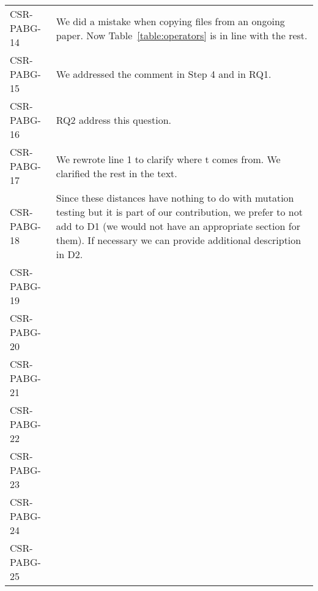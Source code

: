 \begin{longtable}{|p{1.5cm}|p{12cm}|@{}}
\begin{minipage}{12cm}
\end{minipage}\\
\hline
CSR-PABG-14&
\begin{minipage}{12cm}
We did a mistake when copying files from an ongoing paper. Now Table~\ref{table:operators} is in line with the rest.
\end{minipage}\\
\hline
CSR-PABG-15&
\begin{minipage}{12cm}
We addressed the comment in Step 4 and in RQ1.
\end{minipage}\\
\hline
CSR-PABG-16&
\begin{minipage}{12cm}
RQ2 address this question.
\end{minipage}\\
\hline
CSR-PABG-17&
\begin{minipage}{12cm}
We rewrote line 1 to clarify where t comes from.
We clarified the rest in the text.
\end{minipage}\\
\hline
CSR-PABG-18&
\begin{minipage}{12cm}
Since these distances have nothing to do with mutation testing but it is part of our contribution, we prefer to not add to D1 (we would not have an appropriate section for them). If necessary we can provide additional description in D2.
\end{minipage}\\
\hline
CSR-PABG-19&
\begin{minipage}{12cm}
\end{minipage}\\
\hline
CSR-PABG-20&
\begin{minipage}{12cm}
\end{minipage}\\
\hline
CSR-PABG-21&
\begin{minipage}{12cm}
\end{minipage}\\
\hline
CSR-PABG-22&
\begin{minipage}{12cm}
\end{minipage}\\
\hline
CSR-PABG-23&
\begin{minipage}{12cm}
\end{minipage}\\
\hline
CSR-PABG-24&
\begin{minipage}{12cm}
\end{minipage}\\
\hline
CSR-PABG-25&

\end{longtable}
